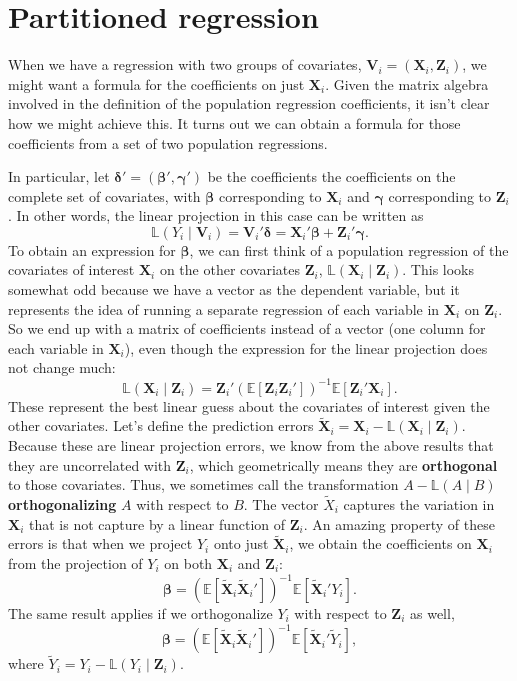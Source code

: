 \documentclass[
  letterpaper,
  DIV=11,
  numbers=noendperiod]{scrreprt}
\newcommand{\bs}{\symbf}
\newcommand{\mb}{\symbf}
\newcommand{\E}{\mathbb{E}}
\newcommand{\bbL}{\mathbb{L}}
\newcommand{\X}{\mb{X}}
\newcommand{\bfbeta}{\mb{\beta}}
\theoremstyle{definition}
\theoremstyle{plain}
\theoremstyle{definition}
\theoremstyle{remark}
\begin{document}
\hypertarget{partitioned-regression}{%
\section{Partitioned regression}\label{partitioned-regression}}

When we have a regression with two groups of covariates,
\(\mb{V}_{i} = (\X_{i}, \mb{Z}_{i})\), we might want a formula for the
coefficients on just \(\X_i\). Given the matrix algebra involved in the
definition of the population regression coefficients, it isn't clear how
we might achieve this. It turns out we can obtain a formula for those
coefficients from a set of two population regressions.

In particular, let \(\bs{\delta}' = (\bfbeta', \bs{\gamma}')\) be the
coefficients the coefficients on the complete set of covariates, with
\(\bfbeta\) corresponding to \(\X_i\) and \(\bs{\gamma}\) corresponding
to \(\mb{Z}_i\). In other words, the linear projection in this case can
be written as \[ 
\bbL(Y_{i} \mid \mb{V}_{i})= \mb{V}_{i}'\mb{\delta} =  \X_{i}'\bfbeta + \mb{Z}_{i}'\bs{\gamma}.
\] To obtain an expression for \(\bfbeta\), we can first think of a
population regression of the covariates of interest \(\X_i\) on the
other covariates \(\mb{Z}_i\), \(\bbL(\X_{i} \mid \mb{Z}_{i})\). This
looks somewhat odd because we have a vector as the dependent variable,
but it represents the idea of running a separate regression of each
variable in \(\X_i\) on \(\mb{Z}_i\). So we end up with a matrix of
coefficients instead of a vector (one column for each variable in
\(\X_i\)), even though the expression for the linear projection does not
change much: \[ 
\bbL(\X_{i} \mid \mb{Z}_{i}) = \mb{Z}_{i}'\left(\E[\mb{Z}_{i}\mb{Z}_{i}']\right)^{{-1}} \E[\mb{Z}_{i}'\X_{i}].
\] These represent the best linear guess about the covariates of
interest given the other covariates. Let's define the prediction errors
\(\widetilde{\X}_i = \X_i - \bbL(\X_{i} \mid \mb{Z}_{i})\). Because
these are linear projection errors, we know from the above results that
they are uncorrelated with \(\mb{Z}_i\), which geometrically means they
are \textbf{orthogonal} to those covariates. Thus, we sometimes call the
transformation \(A - \bbL(A \mid B)\) \textbf{orthogonalizing} \(A\)
with respect to \(B\). The vector \(\widetilde{X}_i\) captures the
variation in \(\X_i\) that is not capture by a linear function of
\(\mb{Z}_i\). An amazing property of these errors is that when we
project \(Y_i\) onto just \(\widetilde{\X}_i\), we obtain the
coefficients on \(\X_i\) from the projection of \(Y_i\) on both \(\X_i\)
and \(\mb{Z}_i\): \[ 
\bfbeta = \left( \E[\widetilde{\X}_{i}\widetilde{\X}_{i}'] \right)^{-1}\E[\widetilde{\X}_{i}'Y_{i}].
\] The same result applies if we orthogonalize \(Y_i\) with respect to
\(\mb{Z}_i\) as well,\\
\[ 
\bfbeta = \left( \E[\widetilde{\X}_{i}\widetilde{\X}_{i}'] \right)^{-1}\E[\widetilde{\X}_{i}'\widetilde{Y}_{i}],
\] where \(\widetilde{Y}_i = Y_i - \bbL(Y_{i} \mid \mb{Z}_{i})\).
\end{document}
